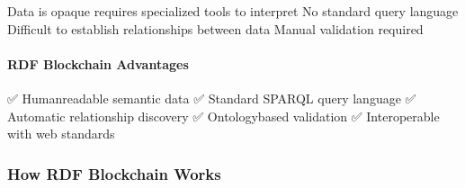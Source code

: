 \documentclass[letterpaper,10pt,english]{sphinxmanual}
\begin{document}
\sphinxAtStartPar
{}
\sphinxhyphen{} Data is opaque \sphinxhyphen{} requires specialized tools to interpret
\sphinxhyphen{} No standard query language
\sphinxhyphen{} Difficult to establish relationships between data
\sphinxhyphen{} Manual validation required


\paragraph{RDF Blockchain Advantages}
\label{\detokenize{foundational/intro-to-rdf-blockchain:rdf-blockchain-advantages}}
\begin{sphinxVerbatim}[commandchars=\\\{\}]
 
     
                     
                     
                     
                     

     
                     
                     
\end{sphinxVerbatim}

\sphinxAtStartPar
{}
\sphinxhyphen{} ✅ Human\sphinxhyphen{}readable semantic data
\sphinxhyphen{} ✅ Standard SPARQL query language
\sphinxhyphen{} ✅ Automatic relationship discovery
\sphinxhyphen{} ✅ Ontology\sphinxhyphen{}based validation
\sphinxhyphen{} ✅ Interoperable with web standards


\subsubsection{How RDF Blockchain Works}
\label{\detokenize{foundational/intro-to-rdf-blockchain:how-rdf-blockchain-works}}
\end{document}
